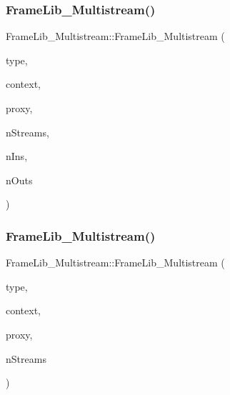 \subsubsection{\texorpdfstring{Frame\+Lib\+\_\+\+Multistream()}{FrameLib\_Multistream()}\hspace{0.1cm}{\footnotesize\ttfamily [1/3]}}
{\footnotesize\ttfamily Frame\+Lib\+\_\+\+Multistream\+::\+Frame\+Lib\+\_\+\+Multistream (\begin{DoxyParamCaption}\item[{\hyperlink{_frame_lib___types_8h_a842c5e2e69277690b064bf363c017980}{Object\+Type}}]{type,  }\item[{\hyperlink{class_frame_lib___context}{Frame\+Lib\+\_\+\+Context}}]{context,  }\item[{\hyperlink{struct_frame_lib___proxy}{Frame\+Lib\+\_\+\+Proxy} $\ast$}]{proxy,  }\item[{unsigned long}]{n\+Streams,  }\item[{unsigned long}]{n\+Ins,  }\item[{unsigned long}]{n\+Outs }\end{DoxyParamCaption})\hspace{0.3cm}{\ttfamily [inline]}}

\mbox{\label{class_frame_lib___multistream_afdbbf88bf219b9bd70cfb9af370f35b9}} 
\subsubsection{\texorpdfstring{Frame\+Lib\+\_\+\+Multistream()}{FrameLib\_Multistream()}\hspace{0.1cm}{\footnotesize\ttfamily [2/3]}}
{\footnotesize\ttfamily Frame\+Lib\+\_\+\+Multistream\+::\+Frame\+Lib\+\_\+\+Multistream (\begin{DoxyParamCaption}\item[{\hyperlink{_frame_lib___types_8h_a842c5e2e69277690b064bf363c017980}{Object\+Type}}]{type,  }\item[{\hyperlink{class_frame_lib___context}{Frame\+Lib\+\_\+\+Context}}]{context,  }\item[{\hyperlink{struct_frame_lib___proxy}{Frame\+Lib\+\_\+\+Proxy} $\ast$}]{proxy,  }\item[{unsigned long}]{n\+Streams }\end{DoxyParamCaption})\hspace{0.3cm}{\ttfamily [inline]}}

